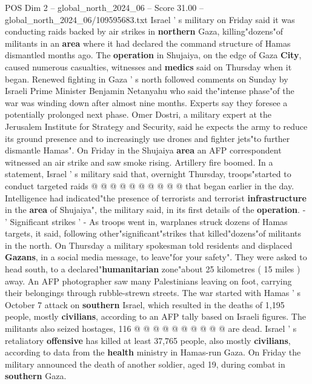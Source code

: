 \begin{textsample}{POS Dim 2 – global\_north\_2024\_06 – Score 31.00 – global\_north\_2024\_06/109595683.txt}  \label{ex:f2_pos_252}
Israel ' s military on Friday said it was conducting raids backed by air strikes in \textbf{northern} Gaza, killing"dozens"of militants in an \textbf{area} where it had declared the command structure of Hamas dismantled months ago.
The \textbf{operation} in Shujaiya, on the edge of Gaza \textbf{City}, caused numerous casualties, witnesses and \textbf{medics} said on Thursday when it began.
Renewed fighting in Gaza ' s north followed comments on Sunday by Israeli Prime Minister Benjamin Netanyahu who said the"intense phase"of the war was winding down after almost nine months.
Experts say they foresee a potentially prolonged next phase.
Omer Dostri, a military expert at the Jerusalem Institute for Strategy and Security, said he expects the army to reduce its ground presence and to increasingly use drones and fighter jets"to further dismantle Hamas".
On Friday in the Shujaiya \textbf{area} an AFP correspondent witnessed an air strike and saw smoke rising.
Artillery fire boomed.
In a statement, Israel ' s military said that, overnight Thursday, troops"started to conduct targeted raids @ @ @ @ @ @ @ @ @ @ that began earlier in the day.
Intelligence had indicated"the presence of terrorists and terrorist \textbf{infrastructure} in the \textbf{area} of Shujaiya", the military said, in its first details of the \textbf{operation}. - ' Significant strikes ' - As troops went in, warplanes struck dozens of Hamas targets, it said, following other"significant"strikes that killed"dozens"of militants in the north.
On Thursday a military spokesman told residents and displaced \textbf{Gazans}, in a social media message, to leave"for your safety".
They were asked to head south, to a declared"\textbf{humanitarian} zone"about 25 kilometres ( 15 miles ) away.
An AFP photographer saw many Palestinians leaving on foot, carrying their belongings through rubble-strewn streets.
The war started with Hamas ' s October 7 attack on \textbf{southern} Israel, which resulted in the deaths of 1,195 people, mostly \textbf{civilians}, according to an AFP tally based on Israeli figures.
The militants also seized hostages, 116 @ @ @ @ @ @ @ @ @ @ are dead.
Israel ' s retaliatory \textbf{offensive} has killed at least 37,765 people, also mostly \textbf{civilians}, according to data from the \textbf{health} ministry in Hamas-run Gaza.
On Friday the military announced the death of another soldier, aged 19, during combat in \textbf{southern} Gaza.

\end{textsample}
